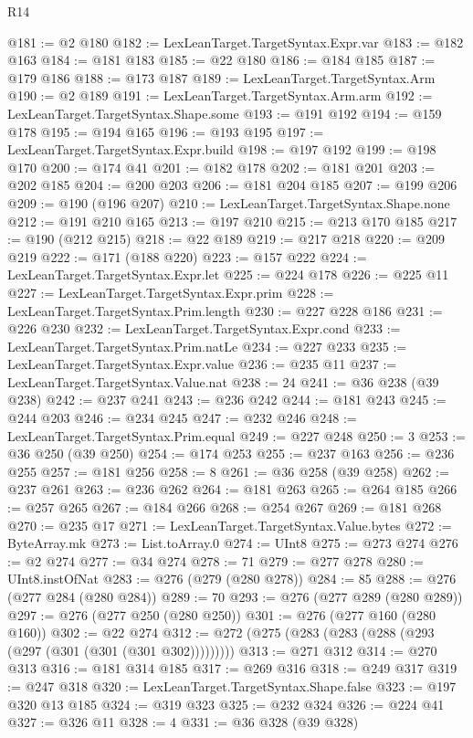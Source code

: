 \begin{lexlean}{R14}
\begin{coremodule}
@181 := @2 @180
@182 := LexLeanTarget.TargetSyntax.Expr.var
@183 := @182 @163
@184 := @181 @183
@185 := @22 @180
@186 := @184 @185
@187 := @179 @186
@188 := @173 @187
@189 := LexLeanTarget.TargetSyntax.Arm
@190 := @2 @189
@191 := LexLeanTarget.TargetSyntax.Arm.arm
@192 := LexLeanTarget.TargetSyntax.Shape.some
@193 := @191 @192
@194 := @159 @178
@195 := @194 @165
@196 := @193 @195
@197 := LexLeanTarget.TargetSyntax.Expr.build
@198 := @197 @192
@199 := @198 @170
@200 := @174 @41
@201 := @182 @178
@202 := @181 @201
@203 := @202 @185
@204 := @200 @203
@206 := @181 @204 @185
@207 := @199 @206
@209 := @190 (@196 @207)
@210 := LexLeanTarget.TargetSyntax.Shape.none
@212 := @191 @210 @165
@213 := @197 @210
@215 := @213 @170 @185
@217 := @190 (@212 @215)
@218 := @22 @189
@219 := @217 @218
@220 := @209 @219
@222 := @171 (@188 @220)
@223 := @157 @222
@224 := LexLeanTarget.TargetSyntax.Expr.let
@225 := @224 @178
@226 := @225 @11
@227 := LexLeanTarget.TargetSyntax.Expr.prim
@228 := LexLeanTarget.TargetSyntax.Prim.length
@230 := @227 @228 @186
@231 := @226 @230
@232 := LexLeanTarget.TargetSyntax.Expr.cond
@233 := LexLeanTarget.TargetSyntax.Prim.natLe
@234 := @227 @233
@235 := LexLeanTarget.TargetSyntax.Expr.value
@236 := @235 @11
@237 := LexLeanTarget.TargetSyntax.Value.nat
@238 := 24
@241 := @36 @238 (@39 @238)
@242 := @237 @241
@243 := @236 @242
@244 := @181 @243
@245 := @244 @203
@246 := @234 @245
@247 := @232 @246
@248 := LexLeanTarget.TargetSyntax.Prim.equal
@249 := @227 @248
@250 := 3
@253 := @36 @250 (@39 @250)
@254 := @174 @253
@255 := @237 @163
@256 := @236 @255
@257 := @181 @256
@258 := 8
@261 := @36 @258 (@39 @258)
@262 := @237 @261
@263 := @236 @262
@264 := @181 @263
@265 := @264 @185
@266 := @257 @265
@267 := @184 @266
@268 := @254 @267
@269 := @181 @268
@270 := @235 @17
@271 := LexLeanTarget.TargetSyntax.Value.bytes
@272 := ByteArray.mk
@273 := List.toArray.{0}
@274 := UInt8
@275 := @273 @274
@276 := @2 @274
@277 := @34 @274
@278 := 71
@279 := @277 @278
@280 := UInt8.instOfNat
@283 := @276 (@279 (@280 @278))
@284 := 85
@288 := @276 (@277 @284 (@280 @284))
@289 := 70
@293 := @276 (@277 @289 (@280 @289))
@297 := @276 (@277 @250 (@280 @250))
@301 := @276 (@277 @160 (@280 @160))
@302 := @22 @274
@312 := @272 (@275 (@283 (@283 (@288 (@293 (@297 (@301 (@301 (@301 @302)))))))))
@313 := @271 @312
@314 := @270 @313
@316 := @181 @314 @185
@317 := @269 @316
@318 := @249 @317
@319 := @247 @318
@320 := LexLeanTarget.TargetSyntax.Shape.false
@323 := @197 @320 @13 @185
@324 := @319 @323
@325 := @232 @324
@326 := @224 @41
@327 := @326 @11
@328 := 4
@331 := @36 @328 (@39 @328)

\end{coremodule}
\end{lexlean}
